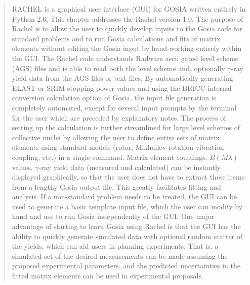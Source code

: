 \documentclass[10pt]{article}
\begin{document}
\begin{abstract}
RACHEL is a graphical user interface (GUI) for GOSIA written entirely in Python 2.6. This chapter addresses the Rachel version 1.0. The purpose of Rachel is to allow the user to quickly develop inputs to the Gosia code for standard problems and to run Gosia calculations and fits of matrix elements without editing the Gosia input by hand-working entirely within the GUI. The Rachel code understands Radware ascii gated level scheme (AGS) files and is able to read both the level scheme and, optionally $\gamma$-ray yield data from the AGS files or text files. By automatically generating ELAST or SRIM stopping power values and using the BRICC internal conversion calculation option of Gosia, the input file generation is completely automated, except for several input prompts by the terminal for the user which are preceded by explanatory notes. The process of setting up the calculation is further streamlined for large level schemes of collective nuclei by allowing the user to define entire sets of matrix elements using standard models (rotor, Mikhailov rotation-vibration coupling, etc.) in a single command. Matrix element couplings, $B(M \lambda)$ values, $\gamma$-ray yield data (measured and calculated) can be instantly displayed graphically, so that the user does not have to extract these items from a lengthy Gosia output file. This greatly facilitates fitting and analysis. If a non-standard problem needs to be treated, the GUI can be used to generate a basic template input file, which the user can modify by hand and use to run Gosia independently of the GUI. One major advantage of starting to learn Gosia using Rachel is that the GUI has the ability to quickly generate simulated data with optional random scatter of the yields, which can aid users in planning experiments. That is, a simulated set of the desired measurements can be made assuming the proposed experimental parameters, and the predicted uncertainties in the fitted matrix elements can be used in experimental proposals.
\end{abstract}
\end{document}
